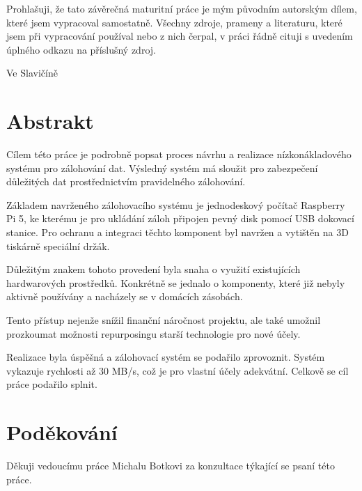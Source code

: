 \documentclass[a4paper,12pt, oneside]{book}
\makeatletter
\let\newauthor\@author
\let\newdate\@date
\makeatother
\begin{document}
\newpage
\mbox{}
\newpage


\noindent

Prohlašuji, že tato závěrečná maturitní práce je mým původním autorským dílem,
které jsem vypracoval samostatně. Všechny zdroje, prameny a literaturu, které
jsem při vypracování používal nebo z nich čerpal, v práci řádně cituji
s uvedením úplného odkazu na příslušný zdroj.

\begin{center}
Ve Slavičíně

\newdate

\vspace{10mm}

\newauthor
\end{center}

\newpage
\section*{Abstrakt}

Cílem této práce je podrobně popsat proces návrhu a realizace nízkonákladového
systému pro zálohování dat.  Výsledný systém má sloužit pro zabezpečení důležitých
dat prostřednictvím pravidelného zálohování.

Základem navrženého zálohovacího systému je jednodeskový počítač Raspberry Pi 5,
ke kterému je pro ukládání záloh připojen pevný disk pomocí USB
dokovací stanice. Pro ochranu a integraci těchto komponent byl navržen a
vytištěn na 3D tiskárně speciální držák. 

Důležitým znakem tohoto provedení byla snaha o využití existujících
hardwarových prostředků. Konkrétně se jednalo o komponenty, které již nebyly
aktivně používány a nacházely se v domácích zásobách.

Tento přístup nejenže snížil finanční náročnost projektu, ale také umožnil
prozkoumat možnosti repurposingu starší technologie pro nové účely.

Realizace byla úspěšná a zálohovací systém se podařilo zprovoznit. Systém
vykazuje rychlosti až 30 MB/s, což je pro vlastní účely adekvátní. Celkově 
se cíl práce podařilo splnit.

\newpage
\section*{Poděkování}

Děkuji vedoucímu práce Michalu Botkovi za konzultace týkající 
se psaní této práce. 

\tableofcontents
\end{document}
